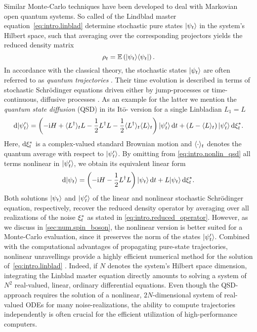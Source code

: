 Similar Monte-Carlo techniques have been developed to deal with Markovian open quantum systems.
So called  of the Lindblad master equation~\ref{eq:intro.linblad} determine stochastic pure states $| \psi_t \rangle$ in the system's Hilbert space, such that averaging over the corresponding projectors yields the reduced density matrix
\begin{equation}
  \rho_t = \E[\ket{\psi_t}\bra{\psi_t}].
  \label{eq:intro.reduced_operator}
\end{equation}
In accordance with the classical theory, the stochastic states $| \psi_t \rangle$ are often referred to as \emph{quantum trajectories} \cite{Ca93_quantum_optics}.
Their time evolution is described in terms of stochastic Schrödinger equations driven either by jump-processes \cite{GaZo04_quantum_noise} or time-continuous, diffusive processes \cite{Ca93_quantum_optics,Pe98_qsd,BrPe2002_open_quantum}.
As an example for the latter we mention the \emph{quantum state diffusion} (\textsc{QSD}) in its It\=o- version for a single Linbladian $L_1 = L$ \cite{Pe98_qsd}
\begin{equation*}
  \mathrm{d}| \psi'_t \rangle = \left( -\mathrm{i} H + \langle L^\dagger \rangle_t L - \frac{1}{2} L^\dagger L - \frac{1}{2}\langle L^\dagger \rangle_t \langle L \rangle_t \right)| \psi'_t \rangle \, \mathrm{d} t + \left( L - \langle L \rangle_t \right) | \psi'_t \rangle \, \mathrm{d}{\xi}^*_t.
  \label{eq:intro.nonlin_qsd}
\end{equation*}
Here, $\mathrm{d}{\xi}^*_t$ is a complex-valued standard Brownian motion and $\langle \cdot \rangle_t$ denotes the quantum average with respect to $| \psi'_t \rangle$.
By omitting from \autoref{eq:intro.nonlin_qsd} all terms nonlinear in $| \psi'_t \rangle$, we obtain its equivalent linear form
\begin{equation}
  \mathrm{d}| \psi_t \rangle = \left( -\mathrm{i}H - \frac{1}{2} L^\dagger L \right)| \psi_t \rangle \, \mathrm{d} t + L| \psi_t \rangle \, \mathrm{d}{\xi}^*_t.
  \label{eq:intro.lin_qsd}
\end{equation}
Both solutions $| \psi_t \rangle$ and $| \psi'_t \rangle$ of the linear and nonlinear stochastic Schrödinger equation, respectively, recover the reduced density operator by averaging over all realizations of the noise ${\xi}^*_t$ as stated in \autoref{eq:intro.reduced_operator}.
However, as we discuss in \autoref{sec:num.spin_boson}, the nonlinear version is better suited for a Monte-Carlo evaluation, since it preserves the norm of the states $| \psi'_t \rangle$.
Combined with the computational advantages of propagating pure-state trajectories, nonlinear unravellings provide a highly efficient numerical method for the solution of~\ref{eq:intro.linblad} \cite{Ca93_quantum_optics,Pe98_qsd}.
Indeed, if $N$ denotes the system's Hilbert space dimension, integrating the Linblad master equation directly amounts to solving a system of $N^2$ real-valued, linear, ordinary differential equations.
Even though the \textsc{QSD}-approach requires the solution of a nonlinear, $2N$-dimensional system of real-valued ODEs for many noise-realizations, the ability to compute trajectories independently is often crucial for the efficient utilization of high-performance computers.

